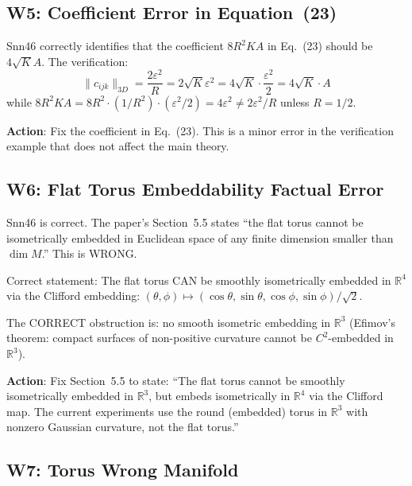 \documentclass{article}
\begin{document}
\subsection{W5: Coefficient Error in Equation~(23)}

\begin{accept}
Snn46 correctly identifies that the coefficient $8R^2KA$ in Eq.~(23) should be
$4\sqrt{K}A$. The verification:
\[
  \|c_{ijk}\|_{3D} = \frac{2\varepsilon^2}{R} = 2\sqrt{K}\varepsilon^2 = 4\sqrt{K} \cdot \frac{\varepsilon^2}{2} = 4\sqrt{K} \cdot A
\]
while $8R^2 K A = 8R^2 \cdot (1/R^2) \cdot (\varepsilon^2/2) = 4\varepsilon^2 \neq
2\varepsilon^2/R$ unless $R = 1/2$.

\textbf{Action}: Fix the coefficient in Eq.~(23). This is a minor error in the
verification example that does not affect the main theory.
\end{accept}

\subsection{W6: Flat Torus Embeddability Factual Error}

\begin{accept}
Snn46 is correct. The paper's Section~5.5 states ``the flat torus cannot be
isometrically embedded in Euclidean space of any finite dimension smaller than
$\dim M$.'' This is WRONG.

Correct statement: The flat torus CAN be smoothly isometrically embedded in
$\mathbb{R}^4$ via the Clifford embedding:
$(\theta,\phi) \mapsto (\cos\theta, \sin\theta, \cos\phi, \sin\phi)/\sqrt{2}$.

The CORRECT obstruction is: no smooth isometric embedding in $\mathbb{R}^3$
(Efimov's theorem: compact surfaces of non-positive curvature cannot be
$C^2$-embedded in $\mathbb{R}^3$).

\textbf{Action}: Fix Section~5.5 to state: ``The flat torus cannot be smoothly
isometrically embedded in $\mathbb{R}^3$, but embeds isometrically in
$\mathbb{R}^4$ via the Clifford map. The current experiments use the round
(embedded) torus in $\mathbb{R}^3$ with nonzero Gaussian curvature, not the
flat torus.''
\end{accept}

\subsection{W7: Torus Wrong Manifold}
\end{document}
